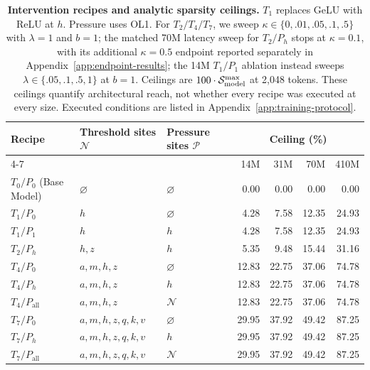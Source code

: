 \begin{table}[H]
\centering\small
\caption{\textbf{Intervention recipes and analytic sparsity ceilings.}
$T_1$ replaces GeLU with ReLU at $h$. Pressure uses OL1. For $T_2/T_4/T_7$, we sweep $\kappa\in\{0,.01,.05,.1,.5\}$ with $\lambda=1$ and $b=1$; the matched 70M latency sweep for $T_2/P_h$ stops at $\kappa=0.1$, with its additional $\kappa=0.5$ endpoint reported separately in Appendix~\ref{app:endpoint-results}; the 14M $T_1/P_1$ ablation instead sweeps $\lambda\in\{.05,.1,.5,1\}$ at $b=1$. Ceilings are $100\cdot\mathcal{S}_{\mathrm{model}}^{\max}$ at 2,048 tokens. These ceilings quantify architectural reach, not whether every recipe was executed at every size. Executed conditions are listed in Appendix~\ref{app:training-protocol}.}
\label{tab:interventions}
\vspace{4pt}
\setlength{\tabcolsep}{5pt}
\begin{tabular}{@{}lllrrrr@{}}
\toprule
Recipe & Threshold sites $\mathcal{N}$ & Pressure sites $\mathcal{P}$ & \multicolumn{4}{c}{Ceiling (\%)} \\
\cmidrule(l){4-7}
 & & & 14M & 31M & 70M & 410M \\
\midrule
$T_0/P_0$ (Base Model) & $\varnothing$ & $\varnothing$ & 0.00 & 0.00 & 0.00 & 0.00 \\
\midrule
$T_1/P_0$ & $h$ & $\varnothing$ & 4.28 & 7.58 & 12.35 & 24.93 \\
$T_1/P_1$ & $h$ & $h$ & 4.28 & 7.58 & 12.35 & 24.93 \\
\midrule
$T_2/P_h$ & $h,z$ & $h$ & 5.35 & 9.48 & 15.44 & 31.16 \\
\midrule
$T_4/P_0$ & $a,m,h,z$ & $\varnothing$ & 12.83 & 22.75 & 37.06 & 74.78 \\
$T_4/P_h$ & $a,m,h,z$ & $h$ & 12.83 & 22.75 & 37.06 & 74.78 \\
$T_4/P_{\mathrm{all}}$ & $a,m,h,z$ & $\mathcal{N}$ & 12.83 & 22.75 & 37.06 & 74.78 \\
\midrule
$T_7/P_0$ & $a,m,h,z,q,k,v$ & $\varnothing$ & 29.95 & 37.92 & 49.42 & 87.25 \\
$T_7/P_h$ & $a,m,h,z,q,k,v$ & $h$ & 29.95 & 37.92 & 49.42 & 87.25 \\
$T_7/P_{\mathrm{all}}$ & $a,m,h,z,q,k,v$ & $\mathcal{N}$ & 29.95 & 37.92 & 49.42 & 87.25 \\
\bottomrule
\end{tabular}
\end{table}

